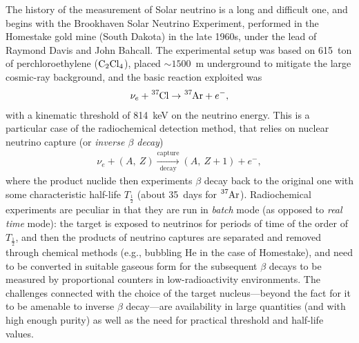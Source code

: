 The history of the measurement of Solar neutrino is a long and difficult one, and
begins with the Brookhaven Solar Neutrino Experiment, performed in the Homestake
gold mine (South Dakota) in the late 1960s, under the lead of Raymond Davis and
John Bahcall. The experimental setup was based on 615~ton of perchloroethylene
($\ce{C_2Cl_4}$), placed $\sim 1500$~m underground to mitigate the large cosmic-ray
background, and the basic reaction exploited was
\begin{align*}
  \nu_e + \ce{^37Cl} \rightarrow \ce{^37Ar} + e^-,
\end{align*}
with a kinematic threshold of 814~keV on the neutrino energy. This is a particular
case of the radiochemical detection method, that relies on nuclear neutrino capture
(or \emph{inverse $\beta$ decay})
\begin{align*}
  \nu_e + (A,~Z) \xrightarrow[\text{decay}]{\text{capture}} (A,~Z+1) + e^-,
\end{align*}
where the product nuclide then experiments $\beta$ decay back to the original one
with some characteristic half-life $T_\frac{1}{2}$ (about 35~days for $\ce{^37Ar}$).
Radiochemical experiments are peculiar in that they are run in \emph{batch} mode
(as opposed to \emph{real time} mode): the target is exposed to neutrinos for periods
of time of the order of $T_\frac{1}{2}$, and then the products of neutrino captures
are separated and removed through chemical methods (e.g., bubbling He in the case
of Homestake), and need to be converted in suitable gaseous form for the subsequent
$\beta$ decays to be measured by proportional counters in low-radioactivity environments.
The challenges connected with the choice of the target nucleus---beyond the fact
for it to be amenable to inverse $\beta$ decay---are availability in large quantities
(and with high enough purity) as well as the need for practical threshold and
half-life values.

